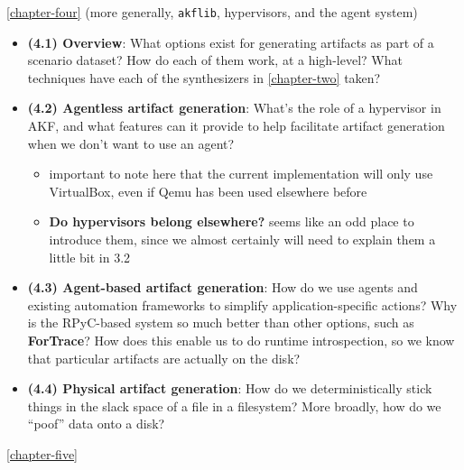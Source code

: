 \autoref{chapter-four} (more generally, \texttt{akflib},
hypervisors, and the agent system)

\begin{itemize}
\tightlist
\item
  \textbf{(4.1) Overview}: What options exist for generating artifacts
  as part of a scenario dataset? How do each of them work, at a
  high-level? What techniques have each of the synthesizers in
  \autoref{chapter-two} taken?
\item
  \textbf{(4.2) Agentless artifact generation}: What's the role of a
  hypervisor in AKF, and what features can it provide to help facilitate
  artifact generation when we don't want to use an agent?

  \begin{itemize}
  \tightlist
  \item
    important to note here that the current implementation will only use
    VirtualBox, even if Qemu has been used elsewhere before
  \item
    \textbf{Do hypervisors belong elsewhere?} seems like an odd place to
    introduce them, since we almost certainly will need to explain them
    a little bit in 3.2
  \end{itemize}
\item
  \textbf{(4.3) Agent-based artifact generation}: How do we use agents
  and existing automation frameworks to simplify application-specific
  actions? Why is the RPyC-based system so much better than other
  options, such as \textbf{ForTrace}? How does this enable us to do
  runtime introspection, so we know that particular artifacts are
  actually on the disk?
\item
  \textbf{(4.4) Physical artifact generation}: How do we
  deterministically stick things in the slack space of a file in a
  filesystem? More broadly, how do we ``poof'' data onto a disk?
\end{itemize}

\autoref{chapter-five}

